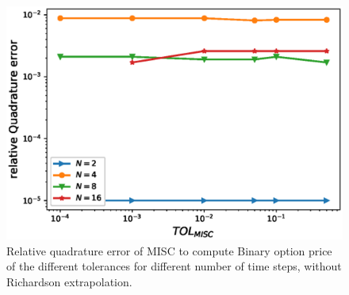 \documentclass[11pt]{article}
\begin{document}
	\begin{figure}[h!]
	\centering
	\includegraphics[width=0.7\linewidth]{./figures/Binary_MISC_quadrature_error/relative_quad_error_wrt_MISC_TOL_non_rich}
	
	
	\caption{Relative quadrature error of MISC to compute Binary option price of the different tolerances for different number of time steps, without Richardson extrapolation.}
	\label{fig:Quadrature_error_non_rich_binary}
\end{figure}
\end{document}
